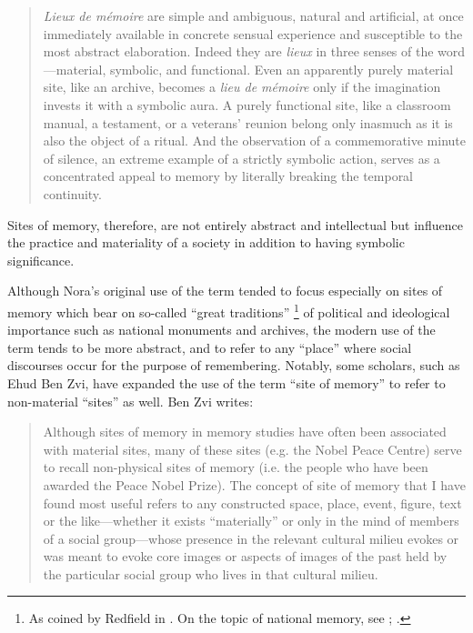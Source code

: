 \begin{quote}
    \emph{Lieux de mémoire} are simple and ambiguous, natural and artificial, at once immediately available in concrete sensual experience and susceptible to the most abstract elaboration. Indeed they are \emph{lieux} in three senses of the word---material, symbolic, and functional. Even an apparently purely material site, like an archive, becomes a \emph{lieu de mémoire} only if the imagination invests it with a symbolic aura. A purely functional site, like a classroom manual, a testament, or a veterans' reunion belong only inasmuch as it is also the object of a ritual. And the observation of a commemorative minute of silence, an extreme example of a strictly symbolic action, serves as a concentrated appeal to memory by literally breaking the temporal continuity.%
        \autocite[18--19]{nora_representations1989}
\end{quote}

\noindent
Sites of memory, therefore, are not entirely abstract and intellectual but influence the practice and materiality of a society in addition to having symbolic significance.

Although Nora's original use of the term tended to focus especially on sites of memory which bear on so-called ``great traditions''%
    \footnote{%
        As coined by Redfield in 
        \cite*[41--42]{redfield1956}.
        On the topic of national memory, see
        \cite{carretero-alphen_wagoner2017};
        \cite{wertsch_wagoner2017}.}
of political and ideological importance such as national monuments and archives, the modern use of the term tends to be more abstract, and to refer to any ``place'' where social discourses occur for the purpose of remembering. Notably, some scholars, such as Ehud Ben Zvi, have expanded the use of the term ``site of memory'' to refer to non-material ``sites'' as well. Ben Zvi writes:

\begin{quote}
    Although sites of memory in memory studies have often been associated with material sites, many of these sites (e.g. the Nobel Peace Centre) serve to recall non-physical sites of memory (i.e. the people who have been awarded the Peace Nobel Prize). The concept of site of memory that I have found most useful refers to any constructed space, place, event, figure, text or the like---whether it exists ``materially'' or only in the mind of members of a social group---whose presence in the relevant cultural milieu evokes or was meant to evoke core images or aspects of images of the past held by the particular social group who lives in that cultural milieu.%
        \autocite{benzvi_st2017}
\end{quote}

